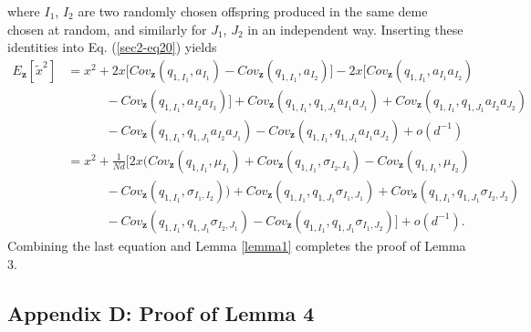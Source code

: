 \documentclass[11pt]{article}
\begin{document}
where $I_1$, $I_2$ are two randomly chosen offspring produced in the same deme chosen at random, and similarly for $J_1$, $J_2$ in an independent way.
Inserting these identities into Eq. (\ref{sec2-eq20}) yields
\begin{align}\label{sec2-eq22}
E_{\mathbf{z}}\left[\tilde{x}^2\right]
&=x^2+2x\Big[Cov_{\mathbf{z}}\left(q_{1,I_1},a_{I_1}\right)-Cov_{\mathbf{z}}\left(q_{1,I_1},a_{I_2}\right)\Big]
-2x\Big[Cov_{\mathbf{z}}\left(q_{1,I_1},a_{I_1}a_{I_2}\right)\nonumber\\
&\quad\quad\quad-Cov_{\mathbf{z}}\left(q_{1,I_1},a_{I_2}a_{I_3}\right)\Big]
+Cov_{\mathbf{z}}\left(q_{1,I_1},q_{1,J_1}a_{I_1}a_{J_1}\right)+
Cov_{\mathbf{z}}\left(q_{1,I_1},q_{1,J_1}a_{I_2}a_{J_2}\right)\nonumber\\
&\quad\quad\quad-Cov_{\mathbf{z}}\left(q_{1,I_1},q_{1,J_1}a_{I_2}a_{J_1}\right)
-Cov_{\mathbf{z}}\left(q_{1,I_1},q_{1,J_1}a_{I_1}a_{J_2}\right)+o\left(d^{-1}\right)\nonumber\\
&=x^2+\frac{1}{Nd}\Big[
2x\Big(Cov_{\mathbf{z}}\left(q_{1,I_1},\mu_{I_1}\right)+Cov_{\mathbf{z}}\left(q_{1,I_1},\sigma_{I_2,I_3}\right)
-Cov_{\mathbf{z}}\left(q_{1,I_1},\mu_{I_2}\right)\nonumber\\
&\quad\quad\quad-Cov_{\mathbf{z}}\left(q_{1,I_1},\sigma_{I_1,I_2}\right)
\Big)+Cov_{\mathbf{z}}\left(q_{1,I_1},q_{1,J_1}\sigma_{I_1,J_1}\right)+Cov_{\mathbf{z}}\left(q_{1,I_1},q_{1,J_1}\sigma_{I_2,J_2}\right)
\nonumber\\
&\quad\quad\quad-Cov_{\mathbf{z}}\left(q_{1,I_1},q_{1,J_1}\sigma_{I_2,J_1}\right)-Cov_{\mathbf{z}}\left(q_{1,I_1},q_{1,J_1}\sigma_{I_1,J_2}\right)\Big]+o\left(d^{-1}\right).
\end{align}
Combining the last equation and Lemma \ref{lemma1} completes the proof of Lemma 3.

\subsection*{Appendix D: Proof of Lemma 4  }
\end{document}
